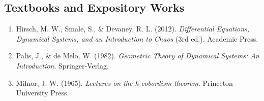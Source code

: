 \subsection*{Textbooks and Expository Works}
\begin{enumerate}
    \item Hirsch, M. W., Smale, S., \& Devaney, R. L. (2012). \textit{Differential Equations, Dynamical Systems, and an Introduction to Chaos} (3rd ed.). Academic Press.
    \item Palis, J., \& de Melo, W. (1982). \textit{Geometric Theory of Dynamical Systems: An Introduction}. Springer-Verlag.
    \item Milnor, J. W. (1965). \textit{Lectures on the h-cobordism theorem}. Princeton University Press.
\end{enumerate}
